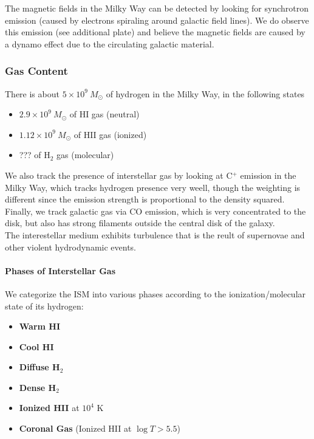 \documentclass[10pt]{article}
\numberwithin{equation}{section}
\newcommand{\n}{\noindent}
\begin{document}
\n The magnetic fields in the Milky Way can be detected by looking for synchrotron emission (caused by electrons spiraling around galactic field lines). We do observe this emission (see additional plate) and believe the magnetic fields are caused by a dynamo effect due to the circulating galactic material.\\

\subsubsection{Gas Content} %
\label{ssub:gas_content}
There is about $5\times 10^9\ M_\odot$ of hydrogen in the Milky Way, in the following states
\begin{itemize}
  \item $2.9\times 10^9\ M_\odot$ of HI gas (neutral)
  \item $1.12\times 10^9\ M_\odot$ of HII gas (ionized)
  \item ??? of H$_{2}$ gas (molecular)
\end{itemize}
We also track the presence of interstellar gas by looking at C$^+$ emission in the Milky Way, which tracks hydrogen presence very weell, though the weighting is different since the emission strength is proportional to the density squared.\\

\n Finally, we track galactic gas via CO emission, which is very concentrated to the disk, but also has strong filaments outside the central disk of the galaxy.\\

\n The interestellar medium exhibits turbulence that is the reult of supernovae and other violent hydrodynamic events.

\paragraph{Phases of Interstellar Gas} %
\label{ssub:phases_of_interstellar_gas}
We categorize the ISM into various phases according to the ionization/molecular state of its hydrogen:
  \begin{itemize}
    \item \textbf{Warm HI}
    \item \textbf{Cool HI}
    \item \textbf{Diffuse H}$_{2}$
    \item \textbf{Dense H}$_{2}$
    \item \textbf{Ionized HII} at $10^4$ K
    \item \textbf{Coronal Gas} (Ionized HII at $\log T > 5.5$)
  \end{itemize}
\end{document}
